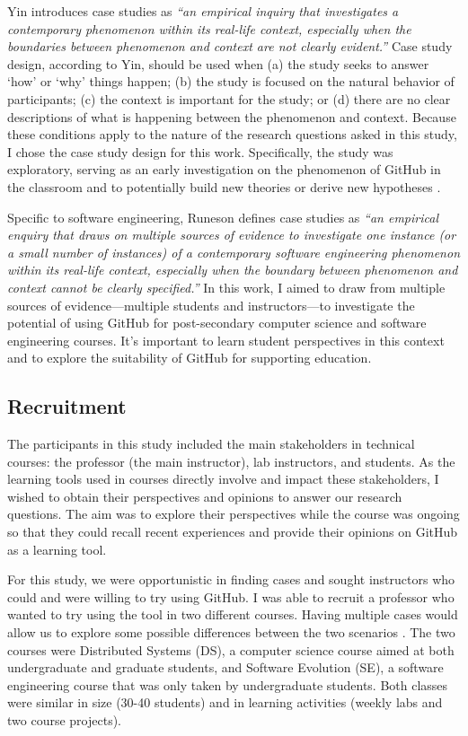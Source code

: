 Yin \cite{yin2013case} introduces case studies as \textit{``an empirical inquiry that investigates a contemporary phenomenon within its real-life context, especially when the boundaries between phenomenon and context are not clearly evident.''} Case study design, according to Yin, should be used when (a) the study seeks to answer `how' or `why' things happen; (b) the study is focused on the natural behavior of participants; (c) the context is important for the study; or (d) there are no clear descriptions of what is happening between the phenomenon and context. Because these conditions apply to the nature of the research questions asked in this study, I chose the case study design for this work. Specifically, the study was exploratory, serving as an early investigation on the phenomenon of GitHub in the classroom and to potentially build new theories or derive new hypotheses \cite{easterbrook2008selecting}.

Specific to software engineering, Runeson \cite{runeson2012case} defines case studies as \textit{``an empirical enquiry that draws on multiple sources of evidence to investigate one instance (or a small number of instances) of a contemporary software engineering phenomenon within its real-life context, especially when the boundary between phenomenon and context cannot be clearly specified.''} In this work, I aimed to draw from multiple sources of evidence---multiple students and instructors---to investigate the potential of using GitHub for post-secondary computer science and software engineering courses. It's important to learn student perspectives in this context and to explore the suitability of GitHub for supporting education.

\subsection{Recruitment}
The participants in this study included the main stakeholders in technical courses: the professor (the main instructor), lab instructors, and students. As the learning tools used in courses directly involve and impact these stakeholders, I wished to obtain their perspectives and opinions to answer our research questions. The aim was to explore their perspectives while the course was ongoing so that they could recall recent experiences and provide their opinions on GitHub as a learning tool.

For this study, we were opportunistic in finding cases and sought instructors who could and were willing to try using GitHub. I was able to recruit a professor who wanted to try using the tool in two different courses. Having multiple cases would allow us to explore some possible differences between the two scenarios \cite{yin2013case}. The two courses were Distributed Systems (DS), a computer science course aimed at both undergraduate and graduate students, and Software Evolution (SE), a software engineering course that was only taken by undergraduate students. Both classes were similar in size (30-40 students) and in learning activities (weekly labs and two course projects).

